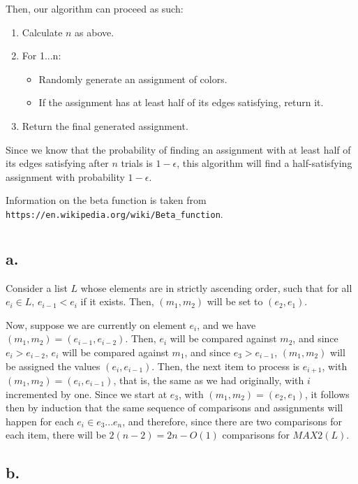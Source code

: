 \documentclass[11pt]{article}
\begin{document}
Then, our algorithm can proceed as such:
\begin{enumerate}
    \item Calculate $n$ as above. 
    \item For 1...n:
        \begin{itemize}
            \item Randomly generate an assignment of colors.
            \item If the assignment has at least half of its edges satisfying, return it.
        \end{itemize}
    \item Return the final generated assignment.
\end{enumerate}

Since we know that the probability of finding an assignment with at least half of its edges satisfying after $n$ trials is $1 - \epsilon$, this algorithm will find a half-satisfying assignment with probability $1 - \epsilon$. 

Information on the beta function is taken from \texttt{https://en.wikipedia.org/wiki/Beta\_function}.


\section{}
\subsection*{a.}

Consider a list $L$ whose elements are in strictly ascending order, such that for all $e_i \in L$, $e_{i-1} < e_i$ if it exists. Then, $(m_1, m_2)$ will be set to $(e_2, e_1)$. 

Now, suppose we are currently on element $e_i$, and we have $(m_1, m_2) = (e_{i-1}, e_{i-2})$. Then, $e_i$ will be compared against $m_2$, and since $e_i > e_{i-2}$, $e_i$ will be compared against $m_1$, and since 
$e_3 > e_{i-1}$, $(m_1, m_2)$ will be assigned the values $(e_i, e_{i-1})$. Then, the next item to process is $e_{i+1}$, with $(m_1, m_2) = (e_i, e_{i-1})$, that is, the same as we had originally, with $i$ incremented by one. Since we start at $e_3$, with $(m_1, m_2) = (e_2, e_1)$, it follows then by induction that the same sequence of comparisons and assignments will happen for each $e_i \in e_3...e_n$, and therefore, since there are two comparisons for each item, there will be $2(n-2) = 2n - O(1)$ comparisons for $MAX2(L)$. 

\subsection{b.}
\end{document}
